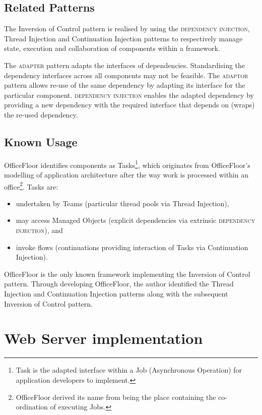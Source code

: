 \documentclass[prodmode]{style/acmlarge}
\begin{document}
\subsection{Related Patterns}

The Inversion of Control pattern is realised by using the \textsc{dependency
injection}, Thread Injection and Continuation Injection patterns to respectively
manage state, execution and collaboration of components within a framework.

The \textsc{adapter} pattern \cite{gof} adapts the interfaces of dependencies.
Standardising the dependency interfaces across all components may not be
feasible.  The \textsc{adaptor} pattern allows re-use of the same dependency by
adapting its interface for the particular component.  \textsc{dependency
injection} enables the adapted dependency by providing a new dependency with the
required interface that depends on (wraps) the re-used dependency.


\subsection{Known Usage}

OfficeFloor \cite{officefloor} identifies components as Tasks\footnote{Task is
the adapted interface within a Job (Asynchronous Operation) for application
developers to implement.}, which originates from OfficeFloor's modelling of
application architecture after the way work is processed within an
office\footnote{OfficeFloor derived its name from being the place containing the
co-ordination of executing Jobs.}.  Tasks are:
\begin{itemize}
  \item undertaken by Teams (particular thread pools via Thread Injection),
  \item may access Managed Objects (explicit dependencies via extrinsic \textsc{dependency injection}), and
  \item invoke flows (continuations providing interaction of Tasks via Continuation Injection).
\end{itemize}

OfficeFloor is the only known framework implementing the Inversion of Control
pattern.  Through developing OfficeFloor, the author identified the Thread
Injection and Continuation Injection patterns along with the subsequent
Inversion of Control pattern.



\section{Web Server implementation}
\end{document}
